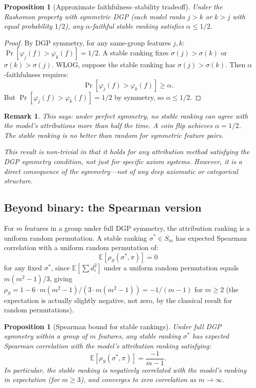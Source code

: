 \documentclass{article}
\newtheorem{proposition}[theorem]{Proposition}
\newtheorem{remark}[theorem]{Remark}
\begin{document}
\begin{proposition}[Approximate faithfulness--stability tradeoff]
\label{prop:approx-tradeoff}
Under the Rashomon property with symmetric DGP (each model
ranks $j > k$ or $k > j$ with equal probability $1/2$), any
$\alpha$-faithful stable ranking satisfies $\alpha \leq 1/2$.
\end{proposition}

\begin{proof}
By DGP symmetry, for any same-group features $j, k$:
$\Pr[\varphi_j(f) > \varphi_k(f)] = 1/2$.
A stable ranking fixes $\sigma(j) > \sigma(k)$ or
$\sigma(k) > \sigma(j)$.
WLOG, suppose the stable ranking has $\sigma(j) > \sigma(k)$.
Then $\alpha$-faithfulness requires:
\[
    \Pr[\varphi_j(f) > \varphi_k(f)] \geq \alpha.
\]
But $\Pr[\varphi_j(f) > \varphi_k(f)] = 1/2$ by symmetry, so
$\alpha \leq 1/2$.
\end{proof}

\begin{remark}
This says: under perfect symmetry, no stable ranking can agree
with the model's attributions more than half the time. A coin
flip achieves $\alpha = 1/2$. The stable ranking is no better
than random for symmetric feature pairs.

This result is non-trivial in that it holds for \emph{any}
attribution method satisfying the DGP symmetry condition, not
just for specific axiom systems. However, it is a direct
consequence of the symmetry---not of any deep axiomatic or
categorical structure.
\end{remark}

\subsection{Beyond binary: the Spearman version}

For $m$ features in a group under full DGP symmetry, the
attribution ranking is a uniform random permutation. A stable
ranking $\sigma^* \in S_m$ has expected Spearman correlation
with a uniform random permutation of:
\[
    \mathbb{E}[\rho_S(\sigma^*, \pi)] = 0
\]
for any fixed $\sigma^*$, since $\mathbb{E}[\sum d_i^2]$
under a uniform random permutation equals $m(m^2 - 1)/3$,
giving $\rho_S = 1 - 6 \cdot m(m^2-1)/(3 \cdot m(m^2-1)) = -1/(m-1)$
for $m \geq 2$ (the expectation is actually slightly negative,
not zero, by the classical result for random permutations).

\begin{proposition}[Spearman bound for stable rankings]
\label{prop:spearman-stable}
Under full DGP symmetry within a group of $m$ features, any
stable ranking $\sigma^*$ has expected Spearman correlation with
the model's attribution ranking satisfying:
\[
    \mathbb{E}[\rho_S(\sigma^*, \pi)] = \frac{-1}{m - 1}.
\]
In particular, the stable ranking is \emph{negatively correlated}
with the model's ranking in expectation (for $m \geq 3$), and
converges to zero correlation as $m \to \infty$.
\end{proposition}
\end{document}

